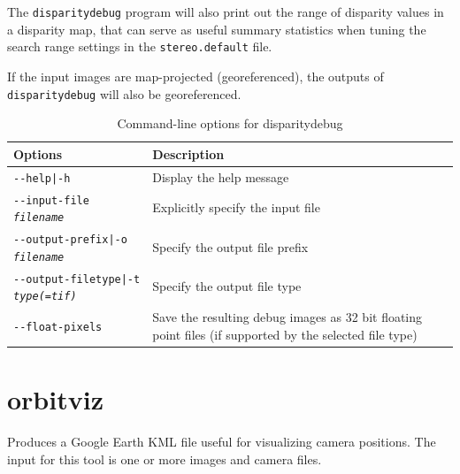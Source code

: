 The {\tt disparitydebug} program will also print out the range of
disparity values in a disparity map, that can serve as useful summary
statistics when tuning the search range settings in the
{\tt stereo.default} file.

If the input images are map-projected (georeferenced), the outputs
of \texttt{disparitydebug} will also be georeferenced.

\begin{longtable}{|l|p{10cm}|}
\caption{Command-line options for disparitydebug}
\label{tbl:disparitydebug}
\endfirsthead
\endhead
\endfoot
\endlastfoot
\hline
Options & Description \\ \hline \hline
\texttt{-\/-help|-h} & Display the help message\\ \hline
\texttt{-\/-input-file \textit{filename}} & Explicitly specify the input file \\ \hline
\texttt{-\/-output-prefix|-o \textit{filename}} & Specify the output file prefix \\ \hline
\texttt{-\/-output-filetype|-t \textit{type(=tif)}} & Specify the output file type \\ \hline
\texttt{-\/-float-pixels} & Save the resulting debug images as 32 bit floating point files (if supported by the selected file type) \\ \hline
\end{longtable}

\section{orbitviz}
\label{orbitviz}

Produces a Google Earth \ac{KML} file useful for visualizing camera
positions. The input for this tool is one or more images and camera
files.

